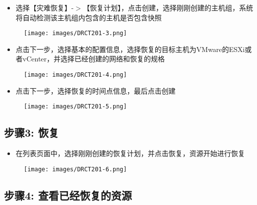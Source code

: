 \begin{itemize}
\item 选择【灾难恢复】-$>$【恢复计划】，点击创建，选择刚刚创建的主机组，系统将自动检测该主机组内包含的主机是否包含快照

\end{itemize}

\begin{figure}[htbp]
\centering
\texttt{[image: images/DRCT201-3.png]}
\end{figure}

\begin{itemize}
\item 点击下一步，选择基本的配置信息，选择恢复的目标主机为VMware的ESXi或者vCenter，并选择已经创建的网络和恢复的规格

\end{itemize}

\begin{figure}[htbp]
\centering
\texttt{[image: images/DRCT201-4.png]}
\end{figure}

\begin{itemize}
\item 点击下一步，选择恢复的时间点信息，最后点击创建

\end{itemize}

\begin{figure}[htbp]
\centering
\texttt{[image: images/DRCT201-5.png]}
\end{figure}

\subsection{步骤3: 恢复}
\label{步骤3:恢复}

\begin{itemize}
\item 在列表页面中，选择刚刚创建的恢复计划，并点击恢复，资源开始进行恢复

\end{itemize}

\begin{figure}[htbp]
\centering
\texttt{[image: images/DRCT201-6.png]}
\end{figure}

\subsection{步骤4: 查看已经恢复的资源}
\label{步骤4:查看已经恢复的资源}

